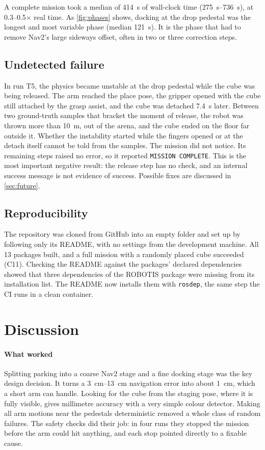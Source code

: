 \documentclass[journal]{IEEEtran}
\begin{document}
A complete mission took a median of \SI{414}{s} of wall-clock time (\SIrange{275}{736}{s}), at 0.3--0.5$\times$ real time. As \cref{fig:phases} shows, docking at the drop pedestal was the longest and most variable phase (median \SI{121}{s}). It is the phase that had to remove Nav2's large sideways offset, often in two or three correction steps.

\subsection{Undetected failure}
\label{sec:undetected}
In run T5, the physics became unstable at the drop pedestal while the cube was being released. The arm reached the place pose, the gripper opened with the cube still attached by the grasp assist, and the cube was detached \SI{7.4}{s} later. Between two ground-truth samples that bracket the moment of release, the robot was thrown more than \SI{10}{m}, out of the arena, and the cube ended on the floor far outside it. Whether the instability started while the fingers opened or at the detach itself cannot be told from the samples. The mission did not notice. Its remaining steps raised no error, so it reported \texttt{MISSION COMPLETE}. This is the most important negative result: the release step has no check, and an internal success message is not evidence of success. Possible fixes are discussed in \cref{sec:future}.

\subsection{Reproducibility}
The repository was cloned from GitHub into an empty folder and set up by following only its README, with no settings from the development machine. All 13 packages built, and a full mission with a randomly placed cube succeeded (C11). Checking the README against the packages' declared dependencies showed that three dependencies of the ROBOTIS package were missing from its installation list. The README now installs them with \texttt{rosdep}, the same step the CI runs in a clean container.

\section{Discussion}

\paragraph*{What worked} Splitting parking into a coarse Nav2 stage and a fine docking stage was the key design decision. It turns a \SIrange{3}{13}{cm} navigation error into about \SI{1}{cm}, which a short arm can handle. Looking for the cube from the staging pose, where it is fully visible, gives millimetre accuracy with a very simple colour detector. Making all arm motions near the pedestals deterministic removed a whole class of random failures. The safety checks did their job: in four runs they stopped the mission before the arm could hit anything, and each stop pointed directly to a fixable cause.
\end{document}
